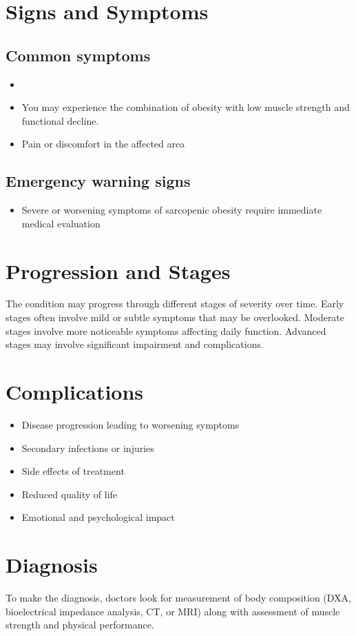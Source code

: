 \section{Signs and Symptoms}
\subsection{Common symptoms}
\begin{itemize}[noitemsep]
  \item \item You may experience the combination of obesity with low muscle strength and functional decline.
  \item Pain or discomfort in the affected area
  \end{itemize}
\subsection{Emergency warning signs}
\begin{itemize}[noitemsep]
  \item Severe or worsening symptoms of sarcopenic obesity require immediate medical evaluation
\end{itemize}
\section{Progression and Stages}
The condition may progress through different stages of severity over time. Early stages often involve mild or subtle symptoms that may be overlooked. Moderate stages involve more noticeable symptoms affecting daily function. Advanced stages may involve significant impairment and complications.
\section{Complications}
\begin{itemize}[noitemsep]
  \item Disease progression leading to worsening symptoms
  \item Secondary infections or injuries
  \item Side effects of treatment
  \item Reduced quality of life
  \item Emotional and psychological impact
\end{itemize}
\section{Diagnosis}
To make the diagnosis, doctors look for measurement of body composition (DXA, bioelectrical impedance analysis, CT, or MRI) along with assessment of muscle strength and physical performance.

